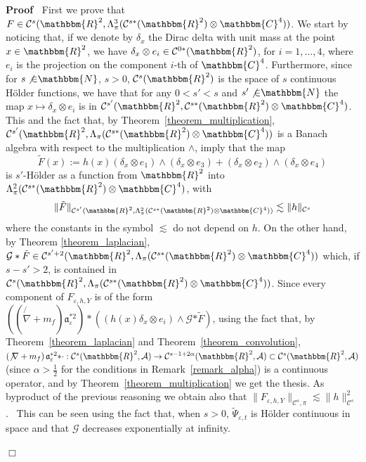 \documentclass[11pt]{article}
\newcommand{\assign}{:=}
\newcommand{\asterisk}{\mathord{*}}
\newenvironment{proof}{\noindent\textbf{Proof\ }}{\hspace*{\fill}$\Box$\medskip}
\begin{document}
\begin{proof}
  First we prove that $F \in \mathcal{C}^s (\mathbbm{R}^2, \Lambda_{\pi}^3
  (\mathcal{C}^{s \ast} (\mathbbm{R}^2) \otimes \mathbbm{C}^4))$. We start by
  noticing that, if we denote by $\delta_x$ the Dirac delta with unit mass at
  the point $x \in \mathbbm{R}^2$, we have $\delta_x \otimes e_i \in
  \mathcal{C}^{0 \ast} (\mathbbm{R}^2)$, for $i = 1, \ldots, 4$, where $e_i$ is
  the projection on the component $i$-th of $\mathbbm{C}^4$. Furthermore, since
  for $s \not{\in} \mathbbm{N}$, $s > 0$, $\mathcal{C}^s (\mathbbm{R}^2)$ is the
  space of $s$ continuous H{\"o}lder functions, we have that for any $0 < s' <
  s$ and $s' \not{\in} \mathbbm{N}$ the map $x \longmapsto \delta_x \otimes
  e_i$ is in $\mathcal{C}^{s'} (\mathbbm{R}^2, \mathcal{C}^{s \ast}
  (\mathbbm{R}^2) \otimes \mathbbm{C}^4)$. This and the fact that, by
  Theorem~\ref{theorem_multiplication}, $\mathcal{C}^{s'} (\mathbbm{R}^2,
  \Lambda_{\pi} (\mathcal{C}^{s \ast} (\mathbbm{R}^2) \otimes \mathbbm{C}^4))$
  is a Banach algebra with respect to the multiplication $\wedge$, imply that
  the map
  \[ \tilde{F} (x) \assign h (x) (\delta_x \otimes e_1) \wedge (\delta_x
     \otimes e_3) + (\delta_x \otimes e_2) \wedge (\delta_x \otimes e_4) \]
  is $s'$-H{\"o}lder as a function from $\mathbbm{R}^2$ into $\Lambda_{\pi}^2
  (\mathcal{C}^{s \ast} (\mathbbm{R}^2) \otimes \mathbbm{C}^4)$, with
  \begin{equation}
    \| \tilde{F} \|_{\mathcal{C}^{s'} (\mathbbm{R}^2, \Lambda_{\pi}^2
    (\mathcal{C}^{s \ast} (\mathbbm{R}^2) \otimes \mathbbm{C}^4))} \lesssim \| h
    \|_{\mathcal{C}^s} \label{eq:inequalityh1}
  \end{equation}
  where the constants in the symbol $\lesssim$ do not depend on $h$. On the
  other hand, by Theorem \ref{theorem_laplacian}, $\mathcal{G} \ast \tilde{F}
  \in \mathcal{C}^{s' + 2} (\mathbbm{R}^2, \Lambda_{\pi} (\mathcal{C}^{s \ast}
  (\mathbbm{R}^2) \otimes \mathbbm{C}^4))$ which, if $s - s' > 2$, is contained
  in $\mathcal{C}^s (\mathbbm{R}^2, \Lambda_{\pi} (\mathcal{C}^{s \ast}
  (\mathbbm{R}^2) \otimes \mathbbm{C}^4))$. Since every component of
  $F_{\varepsilon, h, Y}$ is of the form $\left( \left( \not{\nabla} + m_f
  \right) \mathfrak{a}_{\varepsilon}^{\asterisk 2} \right) \ast ((h (x)
  \delta_x \otimes e_i) \wedge \mathcal{G} \asterisk \tilde{F})$, using the
  fact that, by Theorem~\ref{theorem_laplacian} and
  Theorem~\ref{theorem_convolution}, $\left( \not{\nabla} + m_f \right)
  \mathfrak{a}_{\varepsilon}^{\asterisk 2} \asterisk \cdot : \mathcal{C}^s
  (\mathbbm{R}^2, \mathcal{A}) \rightarrow \mathcal{C}^{s - 1 + 2 \alpha}
  (\mathbbm{R}^2, \mathcal{A}) \subset \mathcal{C}^s (\mathbbm{R}^2,
  \mathcal{A})$ (since $\alpha > \frac{1}{2}$ for the conditions in
  Remark~\ref{remark_alpha}) is a continuous operator, and by
  Theorem~\ref{theorem_multiplication} we get the thesis. As byproduct of the
  previous reasoning we obtain also that $\| F_{\varepsilon, h, Y}
  \|_{\mathcal{C}^s, \pi} \lesssim \| h \|_{\mathcal{C}^s}^2$. \ This can be
  seen using the fact that, when $s > 0$, $\tilde{\Psi}_{\varepsilon, t}$ is
  H{\"o}lder continuous in space and that $\mathcal{G}$ decreases
  exponentially at infinity.
  

\end{proof}
\end{document}
